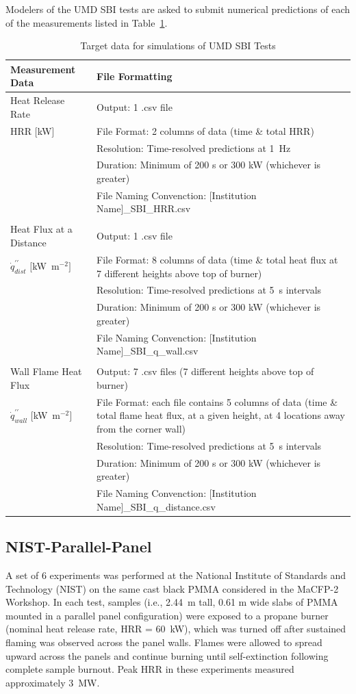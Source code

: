 \documentclass[12pt]{article}
\newcommand{\pp}{\prime\prime}
\begin{document}
Modelers of the UMD SBI tests are asked to submit numerical predictions of each of the measurements listed in Table~\ref{table:SBI}.
\begin{table}[htb]
\caption{Target data for simulations of UMD SBI Tests}
\label{table:SBI} 
\begin{tabular}{p{0.25\linewidth} | p{0.75\linewidth}}
\hline
\textbf{Measurement Data}       	& \textbf{File Formatting } \\
\hline
Heat Release Rate 	& Output: 1 .csv file\\
HRR $[$kW$]$& File Format: 2 columns of data (time \& total HRR)\\
	& Resolution: Time-resolved predictions at 1~Hz \\
	& Duration: Minimum of 200 s or 300 kW (whichever is greater) \\
	& File Naming Convenction: [Institution Name]\_SBI\_HRR.csv \\
&	\\
Heat Flux at a Distance  & Output: 1 .csv file\\
$\dot{q}^{\pp}_{dist}$ $[$kW~m$^{-2}$$]$& File Format: 8 columns of data (time \& total heat flux at 7 different heights above top of burner)\\
	& Resolution: Time-resolved predictions at 5~s intervals \\
	& Duration: Minimum of 200 s or 300 kW (whichever is greater) \\
	& File Naming Convenction: [Institution Name]\_SBI\_q\_wall.csv \\
&	\\
Wall Flame Heat Flux & Output: 7 .csv files (7 different heights above top of burner) \\
$\dot{q}^{\pp}_{wall}$ $[$kW~m$^{-2}$$]$& File Format: each file contains 5 columns of data (time \& total flame heat flux, at a given height, at 4 locations away from the corner wall)\\
	& Resolution: Time-resolved predictions at 5~s intervals \\
	& Duration: Minimum of 200 s or 300 kW (whichever is greater) \\
	& File Naming Convenction: [Institution Name]\_SBI\_q\_distance.csv \\
\hline
\end{tabular}
\end{table}

\FloatBarrier
\subsection {NIST-Parallel-Panel}
A set of 6 experiments was performed at the National Institute of Standards and Technology (NIST) on the same cast black PMMA considered in the MaCFP-2 Workshop. In each test, samples (i.e., 2.44~m tall, 0.61 m wide slabs of PMMA mounted in a parallel panel configuration) were exposed to a propane burner (nominal heat release rate, HRR = 60~kW), which was turned off after sustained flaming was observed across the panel walls. Flames were allowed to spread upward across the panels and continue burning until self-extinction following complete sample burnout. Peak HRR in these experiments measured approximately 3~MW.
\end{document}
